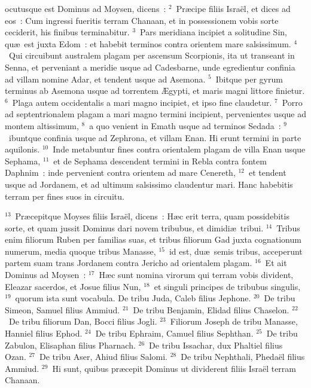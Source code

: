 \bchapter
{}ocutusque est Dominus ad Moysen, dicens~:
${}^{2}$~Pr\ae cipe filiis Isra\"el, et dices ad eos~: Cum ingressi fueritis terram Chanaan, et in possessionem vobis sorte ceciderit, his finibus terminabitur.
${}^{3}$~Pars meridiana incipiet a solitudine Sin, qu\ae\ est juxta Edom~: et habebit terminos contra orientem mare salsissimum.
${}^{4}$~Qui circuibunt australem plagam per ascensum Scorpionis, ita ut transeant in Senna, et perveniant a meridie usque ad Cadesbarne, unde egredientur confinia ad villam nomine Adar, et tendent usque ad Asemona.
${}^{5}$~Ibitque per gyrum terminus ab Asemona usque ad torrentem \AE gypti, et maris magni littore finietur.
${}^{6}$~Plaga autem occidentalis a mari magno incipiet, et ipso fine claudetur.
${}^{7}$~Porro ad septentrionalem plagam a mari magno termini incipient, pervenientes usque ad montem altissimum,
${}^{8}$~a quo venient in Emath usque ad terminos Sedada~:
${}^{9}$~ibuntque confinia usque ad Zephrona, et villam Enan. Hi erunt termini in parte aquilonis.
${}^{10}$~Inde metabuntur fines contra orientalem plagam de villa Enan usque Sephama,
${}^{11}$~et de Sephama descendent termini in Rebla contra fontem Daphnim~: inde pervenient contra orientem ad mare Cenereth,
${}^{12}$~et tendent usque ad Jordanem, et ad ultimum salsissimo claudentur mari. Hanc habebitis terram per fines suos in circuitu.


${}^{13}$~Pr\ae cepitque Moyses filiis Isra\"el, dicens~: H\ae c erit terra, quam possidebitis sorte, et quam jussit Dominus dari novem tribubus, et dimidi\ae\ tribui.
${}^{14}$~Tribus enim filiorum Ruben per familias suas, et tribus filiorum Gad juxta cognationum numerum, media quoque tribus Manasse,
${}^{15}$~id est, du\ae\ semis tribus, acceperunt partem suam trans Jordanem contra Jericho ad orientalem plagam.
${}^{16}$~Et ait Dominus ad Moysen~:
${}^{17}$~H\ae c sunt nomina virorum qui terram vobis divident, Eleazar sacerdos, et Josue filius Nun,
${}^{18}$~et singuli principes de tribubus singulis,
${}^{19}$~quorum ista sunt vocabula. De tribu Juda, Caleb filius Jephone.
${}^{20}$~De tribu Simeon, Samuel filius Ammiud.
${}^{21}$~De tribu Benjamin, Elidad filius Chaselon.
${}^{22}$~De tribu filiorum Dan, Bocci filius Jogli.
${}^{23}$~Filiorum Joseph de tribu Manasse, Hanniel filius Ephod.
${}^{24}$~De tribu Ephraim, Camuel filius Sephthan.
${}^{25}$~De tribu Zabulon, Elisaphan filius Pharnach.
${}^{26}$~De tribu Issachar, dux Phaltiel filius Ozan.
${}^{27}$~De tribu Aser, Ahiud filius Salomi.
${}^{28}$~De tribu Nephthali, Pheda\"el filius Ammiud.
${}^{29}$~Hi sunt, quibus pr\ae cepit Dominus ut dividerent filiis Isra\"el terram Chanaan.

